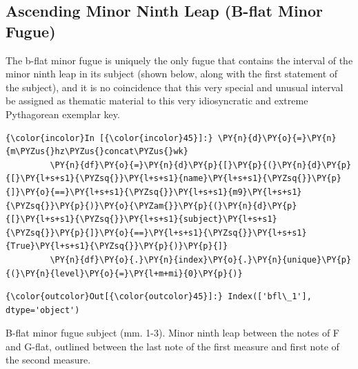     \subsection{Ascending Minor Ninth Leap (B-flat Minor
Fugue)}\label{ascending-minor-ninth-leap-b-flat-minor-fugue}

The b-flat minor fugue is uniquely the only fugue that contains the
interval of the minor ninth leap in its subject (shown below, along with
the first statement of the subject), and it is no coincidence that this
very special and unusual interval be assigned as thematic material to
this very idiosyncratic and extreme Pythagorean exemplar key.

    \begin{Verbatim}[commandchars=\\\{\}]
{\color{incolor}In [{\color{incolor}45}]:} \PY{n}{d}\PY{o}{=}\PY{n}{m\PYZus{}hz\PYZus{}concat\PYZus{}wk}
         \PY{n}{df}\PY{o}{=}\PY{n}{d}\PY{p}{[}\PY{p}{(}\PY{n}{d}\PY{p}{[}\PY{l+s+s1}{\PYZsq{}}\PY{l+s+s1}{name}\PY{l+s+s1}{\PYZsq{}}\PY{p}{]}\PY{o}{==}\PY{l+s+s1}{\PYZsq{}}\PY{l+s+s1}{m9}\PY{l+s+s1}{\PYZsq{}}\PY{p}{)}\PY{o}{\PYZam{}}\PY{p}{(}\PY{n}{d}\PY{p}{[}\PY{l+s+s1}{\PYZsq{}}\PY{l+s+s1}{subject}\PY{l+s+s1}{\PYZsq{}}\PY{p}{]}\PY{o}{==}\PY{l+s+s1}{\PYZsq{}}\PY{l+s+s1}{True}\PY{l+s+s1}{\PYZsq{}}\PY{p}{)}\PY{p}{]}
         \PY{n}{df}\PY{o}{.}\PY{n}{index}\PY{o}{.}\PY{n}{unique}\PY{p}{(}\PY{n}{level}\PY{o}{=}\PY{l+m+mi}{0}\PY{p}{)}
\end{Verbatim}
\begin{Verbatim}[commandchars=\\\{\}]
{\color{outcolor}Out[{\color{outcolor}45}]:} Index(['bfl\_1'], dtype='object')
\end{Verbatim}


\begin{Example}[H]
    \begin{center}
    \caption[Minor ninth in the B-flat minor fugue subject (mm. 1-3). ]{ B-flat minor fugue subject (mm. 1-3). Minor ninth leap between the notes of F and G-flat, outlined between the last note of the first measure and first note of the second measure.}
    \end{center}
\end{Example}
    
